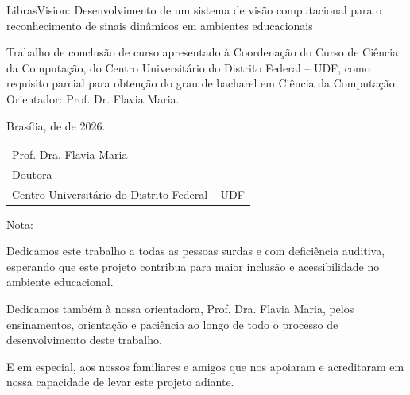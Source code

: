 \documentclass[
	10pt,				%
	openany,
    twoside,			%
	a4paper,			%
    chapter={TITLE},
    section={TITLE},
    subsection={TITLE},
    subsubsection={TITLE},
	english,			%
	french,				%
	spanish,			%
	brazil,				%
	sumario=tradicional
]{abntex2}
\begin{document}
\vspace*{10pt}
\begin{center}
LibrasVision: Desenvolvimento de um sistema de visão computacional para o reconhecimento de sinais dinâmicos em ambientes educacionais
\vspace*{60pt}
\begin{adjustwidth}{6cm}{-1cm}
Trabalho de conclusão de curso apresentado à Coordenação do Curso de Ciência da Computação, do Centro Universitário do Distrito Federal -- UDF, como requisito parcial para obtenção do grau de bacharel em Ciência da Computação. \\[2mm]

Orientador: Prof. Dr. Flavia Maria.
\end{adjustwidth}
\vspace*{40pt}
Brasília, \underline{\hspace{2cm}} de \underline{\hspace{4cm}} de 2026.

\vspace*{60pt}
\begin{tabular}{p{7cm}}
    \hline
    \centering Prof. Dra. Flavia Maria \\
    \centering Doutora \\
    \centering Centro Universitário do Distrito Federal -- UDF
\end{tabular}
\end{center}

\vspace*{40pt}
Nota: \underline{\hspace{2cm}}


\newpage
\begin{dedicatoria2}{}
Dedicamos este trabalho a todas as pessoas surdas e com deficiência auditiva, esperando que este projeto contribua para maior inclusão e acessibilidade no ambiente educacional.

Dedicamos também à nossa orientadora, Prof. Dra. Flavia Maria, pelos ensinamentos, orientação e paciência ao longo de todo o processo de desenvolvimento deste trabalho.

E em especial, aos nossos familiares e amigos que nos apoiaram e acreditaram em nossa capacidade de levar este projeto adiante.
\end{dedicatoria2}
\end{document}
